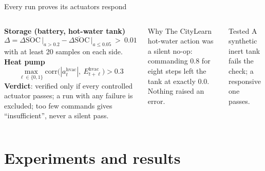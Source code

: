 \documentclass[aspectratio=169,10pt]{beamer}
\newcommand{\SOC}{\mathrm{SOC}}
\begin{document}
\begin{frame}{Every run proves its actuators respond}
\begin{columns}[T]
\textbf{Storage (battery, hot-water tank)}
\[
\Delta = \overline{\Delta\SOC}\,\big|_{a > 0.2} - \overline{\Delta\SOC}\,\big|_{a \le 0.05} \ >\ 0.01
\]
with at least 20 samples on each side.\\[6pt]
\textbf{Heat pump}
\[
\max_{\ell \in \{0,1\}} \mathrm{corr}\big(|a^{\text{hvac}}_t|,\ E^{\text{hvac}}_{t+\ell}\big) > 0.3
\]
\textbf{Verdict}: verified only if every controlled actuator passes; a run with any failure is excluded; too few commands gives ``insufficient'', never a silent pass.
\begin{alertblock}{Why}
The CityLearn hot-water action was a silent no-op: commanding 0.8 for eight steps left the tank at exactly 0.0. Nothing raised an error.
\end{alertblock}
\begin{block}{Tested}
A synthetic inert tank fails the check; a responsive one passes.
\end{block}
\end{columns}
\end{frame}

\section{Experiments and results}
\end{document}
